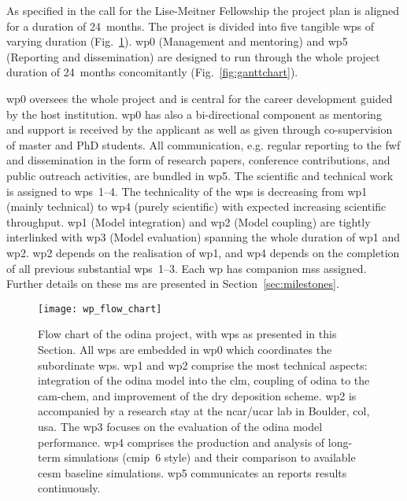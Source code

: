 As specified in the call for the Lise-Meitner Fellowship the project plan is aligned for a duration of 24~months. The project is divided into five tangible \glspl{wp} of varying duration (Fig.~\ref{fig:flowchart}). \gls{wp}0 (Management and mentoring) and \gls{wp}5 (Reporting and dissemination) are designed to run through the whole project duration of 24~months concomitantly (Fig.~\ref{fig:ganttchart}).

\gls{wp}0 oversees the whole project and is central for the career development guided by the host institution. \gls{wp}0 has also a bi-directional component as mentoring and support is received by the applicant as well as given through co-supervision of master and PhD students. All communication, e.g. regular reporting to the \gls{fwf} and dissemination in the form of research papers, conference contributions, and public outreach activities, are bundled in \gls{wp}5. The scientific and technical work is assigned to \glspl{wp}~1--4. The technicality of the \glspl{wp} is decreasing from \gls{wp}1 (mainly technical) to \gls{wp}4 (purely scientific) with expected increasing scientific throughput. \gls{wp}1 (Model integration) and \gls{wp}2 (Model coupling) are tightly interlinked with \gls{wp}3 (Model evaluation) spanning the whole duration of \gls{wp}1 and \gls{wp}2. \gls{wp}2 depends on the realisation of \gls{wp}1, and \gls{wp}4 depends on the completion of all previous substantial \glspl{wp}~1--3. Each \gls{wp} has companion \glspl{ms} assigned. Further details on these \gls{ms} are presented in Section~\ref{sec:milestones}.\\

\begin{figure}[!ht]
  \centering
    \texttt{[image: wp\_flow\_chart]}
    \caption{Flow chart of the \gls{odina} project, with \glspl{wp} as presented in this Section. All \glspl{wp} are embedded in \gls{wp}0 which coordinates the subordinate \glspl{wp}. \gls{wp}1 and \gls{wp}2 comprise the most technical aspects: integration of the \gls{odina} model into the \gls{clm}, coupling of \gls{odina} to the \gls{cam}-chem, and improvement of the dry deposition scheme. \gls{wp}2 is accompanied by a research stay at the \gls{ncar/ucar} lab in Boulder, \acrshort{col}, \acrshort{usa}. The \gls{wp}3 focuses on the evaluation of the \gls{odina} model performance. \gls{wp}4 comprises the production and analysis of long-term simulations (\gls{cmip}~6 style) and their comparison to available \gls{cesm} baseline simulations. \gls{wp}5 communicates an reports results continuously.}
  \label{fig:flowchart}%
  \vspace{-1\baselineskip}
\end{figure}

